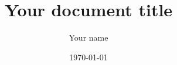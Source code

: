 \documentclass[11pt, a4paper]{jsarticle}
\begin{document}
\title{Your document title}
\author{Your name}
\date{\today}
\thispagestyle{fancy}
\maketitle

\pagestyle{fancy}
\fancyhead{}
\fancyfoot[C]{\thepage}
\renewcommand{\headrulewidth}{0pt}





\end{document}
